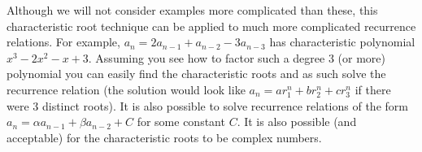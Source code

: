 \documentclass[10pt,]{book}
\theoremstyle{plain}
\theoremstyle{definition}
\theoremstyle{definition}
\theoremstyle{definition}
\numberwithin{equation}{chapter}
\begin{document}
Although we will not consider examples more complicated than these, this characteristic root technique can be applied to much more complicated recurrence relations. For example, \(a_n = 2a_{n-1} + a_{n-2} - 3a_{n-3}\) has characteristic polynomial \(x^3 - 2 x^2 - x + 3\). Assuming you see how to factor such a degree 3 (or more) polynomial you can easily find the characteristic roots and as such solve the recurrence relation (the solution would look like \(a_n = ar_1^n + br_2^n + cr_3^n\) if there were 3 distinct roots). It is also possible to solve recurrence relations of the form \(a_n = \alpha a_{n-1} + \beta a_{n-2} + C\) for some constant \(C\). It is also possible (and acceptable) for the characteristic roots to be complex numbers.
%
\typeout{************************************************}
\typeout{************************************************}
\end{document}
